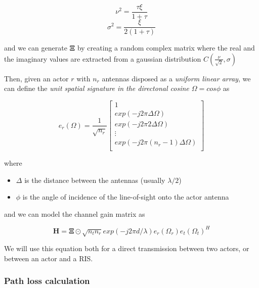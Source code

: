 \begin{equation}
  \nu^2 = \frac{\tau \xi}{1 + \tau}
\end{equation}
\begin{equation}
  \sigma^2 = \frac{\xi}{2(1 + \tau)}
\end{equation}

and we can generate $\bm{\Xi}$ by creating a random complex matrix where the real and the imaginary values are extracted from a gaussian distribution $C(\frac{\nu}{\sqrt{2}}, \sigma)$ \cite{Rice_distribution}

Then, given an actor $r$ with $n_r$ antennas disposed as a \textit{uniform linear array}, we can define the \textit{unit spatial signature in the directonal cosine $\Omega = cos \phi$} \cite{Fundamentals_Wireless_Communication_chapter7} as

\begin{equation}
  e_r(\Omega) = \frac{1}{\sqrt{n_r}}
  \begin{bmatrix}
    1                                \\
    exp(-j2\pi\Delta\Omega)          \\
    exp(-j2\pi2\Delta\Omega)         \\
    \vdots                           \\
    exp(-j2\pi(n_r - 1)\Delta\Omega) \\
  \end{bmatrix}
\end{equation}

where
\begin{itemize}
  \item $\Delta$ is the distance between the antennas (usually $\lambda / 2$)
  \item $\phi$ is the angle of incidence of the line-of-sight onto the actor antenna
\end{itemize}

and we can model the channel gain matrix \cite{Fundamentals_Wireless_Communication_chapter7} as

\begin{equation}
  \bm{H} = \bm{\Xi} \odot \sqrt{n_t n_r} exp(-j2 \pi d / \lambda) e_r(\Omega_r) e_t(\Omega_t)^H
\end{equation}

We will use this equation both for a direct transmission between two actors, or between an actor and a RIS.

\subsubsection{Path loss calculation}

